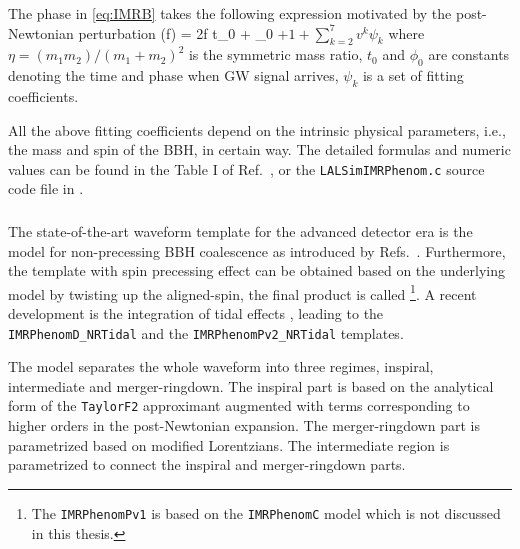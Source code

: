 The phase in \cref{eq:IMRB} takes the following expression motivated by the post-Newtonian perturbation
\be 
\Psi(f) = 2\pi f t_0 + \phi_0 +\(1+\sum_{k=2}^{7} v^k \psi_k\)
\ee
where $\eta = (m_1m_2)/(m_1+m_2)^2$ is the symmetric mass ratio, $t_0$ and $\phi_0$ are constants denoting the time and phase when \ac{GW} signal arrives, $\psi_k$ is a set of fitting coefficients.

All the above fitting coefficients depend on the intrinsic physical parameters, i.e., the mass and spin of the \ac{BBH}, in certain way.
The detailed formulas and numeric values can be found in the Table I of Ref.~\cite{IMRPhenomB}, or the \texttt{LALSimIMRPhenom.c} source code file in {\LAL}.

\subsubsection{\IMRD}

The state-of-the-art waveform template for the advanced detector era is the {\IMRD} model for non-precessing \ac{BBH} coalescence as introduced by Refs.~\cite{IMRPhenomD1,IMRPhenomD2}.
Furthermore, the template with spin precessing effect can be obtained based on the underlying {\IMRD} model \cite{IMRPhenomPv2} by twisting up the aligned-spin, the final product is called {\IMRP} \footnote{The \texttt{IMRPhenomPv1} is based on the \texttt{IMRPhenomC} model which is not discussed in this thesis.}.
A recent development is the integration of tidal effects \cite{IMRNRTidal}, leading to the \texttt{IMRPhenomD\_NRTidal} and the \texttt{IMRPhenomPv2\_NRTidal} templates.   

The {\IMRD} model separates the whole waveform into three regimes, inspiral, intermediate and merger-ringdown.
The inspiral part is based on the analytical form of the \texttt{TaylorF2}  \cite{Buonanno:2009zt} approximant augmented with terms corresponding to higher orders in the post-Newtonian expansion.
The merger-ringdown part is parametrized based on modified Lorentzians.
The intermediate region is parametrized to connect the inspiral and merger-ringdown parts.

